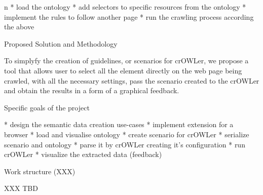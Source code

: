 \begitems \style n
  * load the ontology
  * add selectors to specific resources from the ontology
  * implement the rules to follow another page
  * run the crawling process according the above
\enditems



\sec Proposed Solution and Methodology

To simplyfy the creation of guidelines, or scenarios for crOWLer, we propose a
tool that allows user to select all the element directly on the web page being
crawled, with all the necessary settings, pass the scenario created to the
crOWLer and obtain the results in a form of a graphical feedback. 

\sec Specific goals of the project

\begitems
  * design the semantic data creation use-cases
  * implement extension for a browser
  * load and visualise ontology
  * create scenario for crOWLer 
  * serialize scenario and ontology
  * parse it by crOWLer creating it's configuration
  * run crOWLer
  * visualize the extracted data (feedback)
\enditems


\sec Work structure (XXX)

XXX TBD


